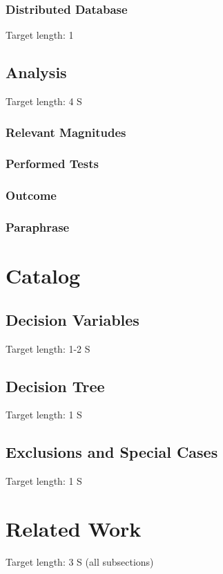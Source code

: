 \documentclass[MSC,Master,english]{twbook}%
\begin{document}
\subsection{Distributed Database}
Target length: 1

\section{Analysis}
Target length: 4 S
\subsection{Relevant Magnitudes}
\subsection{Performed Tests}
\subsection{Outcome}
\subsection{Paraphrase}



\chapter{Catalog}
\label{chap:catalog}

\section{Decision Variables}
\label{sec:variables}
Target length: 1-2 S

\section{Decision Tree}
\label{sec:tree}
Target length: 1 S

\section{Exclusions and Special Cases}
\label{sec:exclusions}
Target length: 1 S



\chapter{Related Work}
\label{chap:related}
Target length: 3 S (all subsections)
\end{document}
